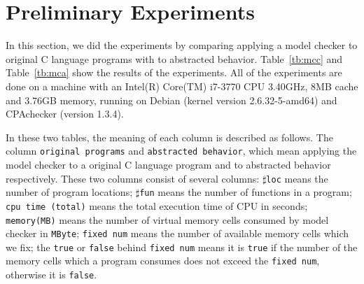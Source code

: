 \section{Preliminary Experiments}
\label{sec:experiment}
In this section, we did the experiments by comparing applying a model
checker to original C language programs with to abstracted
behavior. Table~\ref{tb:mcc} and Table~\ref{tb:mca} show the results
of the experiments. All of the experiments are done on a machine with
an Intel(R) Core(TM) i7-3770 CPU \at 3.40GHz, 8MB cache and 3.76GB memory, running
on Debian (kernel version 2.6.32-5-amd64) and CPAchecker (version 1.3.4).

In these two tables, the meaning of each column is described as
follows. The column \texttt{original programs} and \texttt{abstracted behavior},
which mean applying the model checker to a original C language
program and to abstracted behavior respectively. These two columns
consist of several columns: $\sharp$\texttt{loc} means the number of
program locations; $\sharp$\texttt{fun} means the number of functions
in a program; \texttt{cpu time (total)} means the total execution time
of CPU in seconds; \texttt{memory(MB)} means the number of virtual
memory cells consumed by model checker in \texttt{MByte};
\texttt{fixed num} means the number of available memory cells which we
fix; the \texttt{true} or \texttt{false} behind \texttt{fixed num}
means it is \texttt{true} if the number of the memory cells which a
program consumes does not exceed the \texttt{fixed num}, otherwise it
is \texttt{false}.

